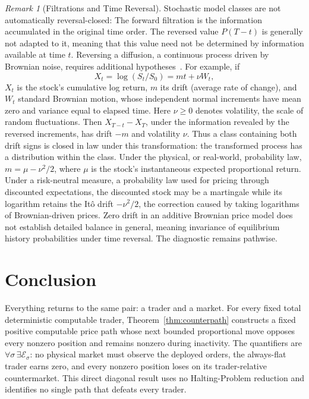 \documentclass[aps,pra,reprint,superscriptaddress,amsmath,amssymb,floatfix]{revtex4-2}
\theoremstyle{plain}
\theoremstyle{definition}
\theoremstyle{remark}
\newtheorem{remark}{Remark}
\begin{document}
\begin{remark}[Filtrations and Time Reversal]
Stochastic model classes are not automatically reversal-closed:
The forward filtration is the information accumulated in the original time
order. The reversed value \(P(T-t)\) is generally not adapted to it, meaning
that this value need not be determined by information available at time \(t\). Reversing a diffusion, a continuous process driven by Brownian noise,
requires additional hypotheses~\cite{HaussmannPardoux1986}. For
example, if
\[
  X_t=\log(S_t/S_0)=mt+\nu W_t,
\]
\(X_t\) is the stock's cumulative log return, \(m\) its drift (average rate of
change), and \(W_t\) standard Brownian motion, whose independent normal
increments have mean zero and variance equal to elapsed time. Here
\(\nu\geq0\) denotes volatility, the scale of random fluctuations. Then \(X_{T-t}-X_T\), under the information revealed
by the reversed increments, has drift \(-m\) and volatility \(\nu\).
Thus a class containing both drift signs is closed in law under this
transformation: the transformed process has a distribution within the class.
Under the physical, or real-world, probability law, \(m=\mu-\nu^2/2\), where \(\mu\) is the stock's
instantaneous expected proportional return. Under a risk-neutral measure,
a probability law used for pricing through discounted expectations, the
discounted stock may be a martingale while its logarithm retains the
It\^o drift \(-\nu^2/2\), the correction caused by taking logarithms of
Brownian-driven prices. Zero drift in an additive Brownian price model does
not establish detailed balance in general, meaning invariance of equilibrium
history probabilities under time reversal. The diagnostic remains pathwise.
\end{remark}

\section{Conclusion}
\label{sec:conclusion}

Everything returns to the same pair: a trader and a market. For every fixed
total deterministic computable trader, Theorem~\ref{thm:counterpath} constructs
a fixed positive computable price path whose next bounded proportional move
opposes every nonzero position and remains nonzero during inactivity.
The quantifiers are
\(\forall\sigma\,\exists\mathcal E_\sigma\): no physical market must observe
the deployed orders, the always-flat trader earns zero, and every nonzero
position loses on its trader-relative countermarket. This direct diagonal
result uses no Halting-Problem reduction and identifies no single path that
defeats every trader.
\end{document}

